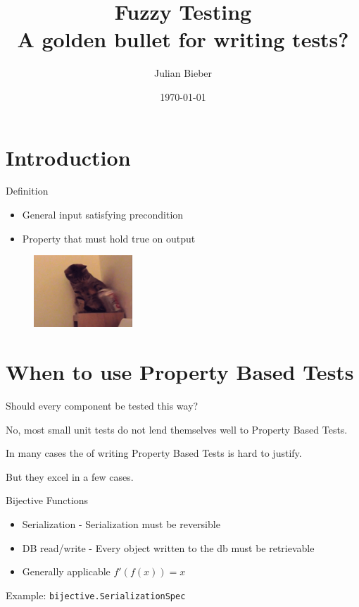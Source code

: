 \documentclass[xcolor=svgnames,handout]{beamer}
\title
[Fuzzy Testing \hspace{2em}]
{Fuzzy Testing \\ A golden bullet for writing tests?}
\author
[Julian Bieber]
{Julian Bieber}
\date
{\today}
\begin{document}
    \maketitle

    \section
    {Introduction}

    \begin{frame}
    {Definition}
        \begin{itemize}
            \item General input satisfying precondition
            \item Property that must hold true on output
        \end{itemize}
        \begin{figure}[ht]
        \centering
        \includegraphics[width=0.33\textwidth]{cat-10.png}
        \end{figure}

    \end{frame}


    \section
    {When to use Property Based Tests}

    \begin{frame}
    {Should every component be tested this way?}

        No, most small unit tests do not lend themselves well to Property Based Tests.

        In many cases the of writing Property Based Tests is hard to justify.

        But they excel in a few cases.
    \end{frame}


    \begin{frame}
    {Bijective Functions}
        \begin{itemize}
            \item Serialization - Serialization must be reversible
            \item DB read/write - Every object written to the db must be retrievable
            \item Generally applicable $f'(f(x)) = x$
        \end{itemize}

        Example: \texttt{bijective.SerializationSpec}
    \end{frame}
\end{document}
